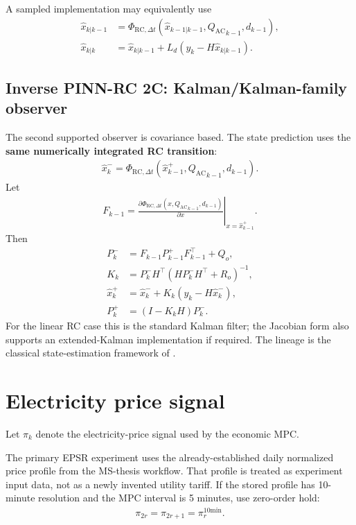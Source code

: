 \documentclass[11pt]{article}
\newcommand{\QAC}{Q_{\mathrm{AC}}}
\begin{document}
A sampled implementation may equivalently use
\begin{align}
\widehat x_{k|k-1}
&=
\Phi_{\mathrm{RC},\Delta t}
(
\widehat x_{k-1|k-1},{\QAC}_{k-1},d_{k-1}
),
\\
\widehat x_{k|k}
&=
\widehat x_{k|k-1}
+
L_d
\left(
y_k-H\widehat x_{k|k-1}
\right).
\tag{6.55}
\end{align}

\subsection{Inverse PINN-RC 2C: Kalman/Kalman-family observer}

The second supported observer is covariance based.  The state prediction uses the \textbf{same
numerically integrated RC transition}:
\begin{align}
\widehat x^-_k
=
\Phi_{\mathrm{RC},\Delta t}
(
\widehat x^+_{k-1},{\QAC}_{k-1},d_{k-1}
).
\tag{6.56}
\end{align}
Let
\begin{align}
F_{k-1}
=
\left.
\frac{\partial
\Phi_{\mathrm{RC},\Delta t}(x,{\QAC}_{k-1},d_{k-1})}
{\partial x}
\right|_{x=\widehat x^+_{k-1}}.
\tag{6.57}
\end{align}
Then
\begin{align}
P^-_k
&=
F_{k-1}P^+_{k-1}F_{k-1}^\top+Q_o,
\\
K_k
&=
P^-_kH^\top
\left(
HP^-_kH^\top+R_o
\right)^{-1},
\\
\widehat x^+_k
&=
\widehat x^-_k
+
K_k
\left(
y_k-H\widehat x^-_k
\right),
\\
P^+_k
&=
(I-K_kH)P^-_k.
\tag{6.58}
\end{align}
For the linear RC case this is the standard Kalman filter; the Jacobian form also supports an
extended-Kalman implementation if required.  The lineage is the classical state-estimation
framework of \citet{kalman1960filter}.

\section{Electricity price signal}

Let \(\pi_k\) denote the electricity-price signal used by the economic MPC.

The primary EPSR experiment uses the already-established daily normalized price profile from the
MS-thesis workflow.  That profile is treated as experiment input data, not as a newly invented
utility tariff.  If the stored profile has 10-minute resolution and the MPC interval is 5 minutes,
use zero-order hold:
\begin{align}
\boxed{
\pi_{2r}=\pi_{2r+1}=\pi_r^{10\mathrm{min}}.
}
\tag{6.59}
\end{align}
\end{document}
